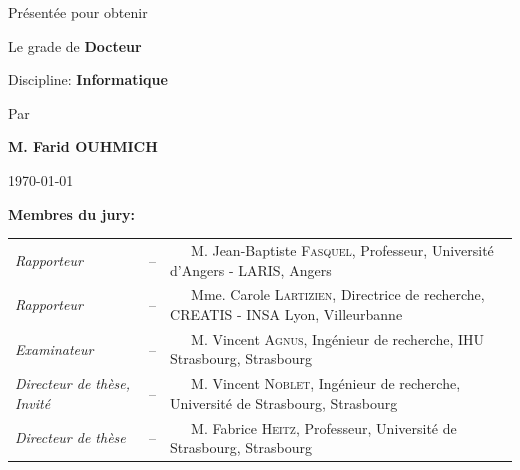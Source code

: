 \begin{titlingpage}
\begin{center}
		\vspace{1\baselineskip}
		
		{\LARGE  Présentée pour obtenir}
		
		\vspace{1\baselineskip}
		
		{\LARGE Le grade de \LARGE \textbf{Docteur}}
		
		\vspace{0.2cm}
		
		{\LARGE Discipline: \LARGE \textbf{Informatique}}
		
		\vspace{0.7\baselineskip}
		
		{\LARGE Par}
		
		\vspace{0.5\baselineskip}
		
		{\LARGE \textbf{M. Farid OUHMICH}}
		
		\vspace{1\baselineskip}
		
		{\Huge \textbf {\textsc{\thetitle}}}
		
		\vspace{1\baselineskip}
	\end{center}
	\vfill
	
	\begin{center}
		\today
	\end{center}
	
	\vspace{1\baselineskip}
	
	\noindent
	\textbf{Membres du jury:}
	
	\begin{tabular}{lcl}
		
		\textit{Rapporteur}&-- &~~~M. Jean-Baptiste \textsc{Fasquel}, Professeur, \small Université d'Angers - LARIS, Angers\\
		\textit{Rapporteur}& -- &~~~Mme. Carole \textsc{Lartizien}, 
		Directrice de recherche, \small CREATIS - INSA Lyon, Villeurbanne\\
		\textit{Examinateur}& -- &~~~M. Vincent \textsc{Agnus},
		Ingénieur de recherche, \small IHU Strasbourg, Strasbourg\\
		\textit{Directeur de thèse, Invité}& -- &~~~M. Vincent \textsc{Noblet}, 
		Ingénieur de recherche, \small Université de Strasbourg, Strasbourg\\
		\textit{Directeur de thèse}& -- &~~~M. Fabrice \textsc{Heitz}, Professeur, \small Université de Strasbourg, Strasbourg\\
	\end{tabular}
	

\end{titlingpage}
